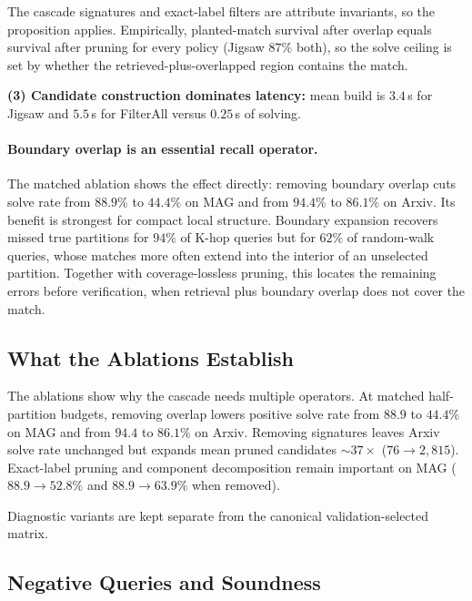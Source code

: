 \documentclass[runningheads]{llncs}
\begin{document}
\begin{samepage}
The cascade signatures and exact-label filters are attribute invariants, so the proposition applies. Empirically, planted-match survival after overlap equals survival after pruning for every policy (Jigsaw $87\%$ both), so the solve ceiling is set by whether the retrieved-plus-overlapped region contains the match.
\end{samepage}

\textbf{(3) Candidate construction dominates latency:} mean build is $3.4$\,s for Jigsaw and $5.5$\,s for FilterAll versus $0.25$\,s of solving.

\paragraph{Boundary overlap is an essential recall operator.}
The matched ablation shows the effect directly: removing boundary overlap cuts solve rate from $88.9\%$ to $44.4\%$ on MAG and from $94.4\%$ to $86.1\%$ on Arxiv. Its benefit is strongest for compact local structure. Boundary expansion recovers missed true partitions for $94\%$ of K-hop queries but for $62\%$ of random-walk queries, whose matches more often extend into the interior of an unselected partition. Together with coverage-lossless pruning, this locates the remaining errors before verification, when retrieval plus boundary overlap does not cover the match.

\subsection{What the Ablations Establish}

The ablations show why the cascade needs multiple operators. At matched half-partition budgets, removing overlap lowers positive solve rate from $88.9$ to $44.4\%$ on MAG and from $94.4$ to $86.1\%$ on Arxiv. Removing signatures leaves Arxiv solve rate unchanged but expands mean pruned candidates ${\sim}37\times$ ($76\to2{,}815$). Exact-label pruning and component decomposition remain important on MAG ($88.9\to52.8\%$ and $88.9\to63.9\%$ when removed).

Diagnostic variants are kept separate from the canonical validation-selected matrix.

\subsection{Negative Queries and Soundness}
\end{document}
